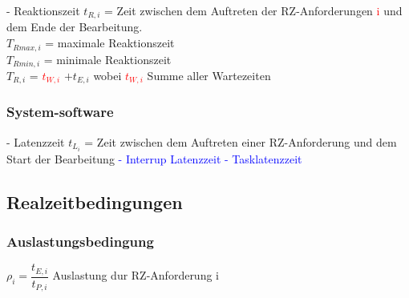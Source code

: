 \documentclass[12pt,a4paper,oneside,ngerman]{article}
\begin{document}

- Reaktionszeit \(t_{R,i}\) = Zeit zwischen dem Auftreten der RZ-Anforderungen \textcolor{red}{i} und dem Ende der Bearbeitung. \\

\(T_{Rmax,i}\) = maximale Reaktionszeit \\
\(T_{Rmin,i}\) = minimale Reaktionszeit \\
\(T_{R,i}\) = \textcolor{red}{\(t_{W,i}\)} \(+ t_{E,i}\) wobei \textcolor{red}{ \(t_{W,i}\) } Summe aller Wartezeiten

\subsubsection{System-software}

- Latenzzeit \(t_{L_i}\) = Zeit zwischen dem Auftreten einer RZ-Anforderung und dem Start der Bearbeitung
\textcolor{blue}{
	- Interrup Latenzzeit
	- Tasklatenzzeit
}

\subsection{Realzeitbedingungen}
\subsubsection{Auslastungsbedingung}

\(\rho_i = \dfrac{t_{E,i}}{t_{P,i}}\) Auslastung dur RZ-Anforderung i \\
\end{document}
